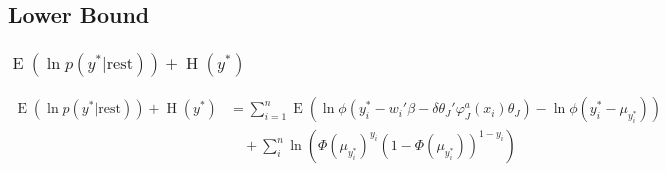 \documentclass[11pt]{article}
\newcommand{\opn}{\operatorname}
\begin{document}
\subsection{Lower Bound}
\subsubsection{$\opn{E}\left(\ln p\left(y^{*}|\text{rest}\right)\right)+\opn{H}\left(y^{*}\right)$}
  \begin{align*}
    \opn{E}\left(\ln p\left(y^{*}|\text{rest}\right)\right) + \opn{H}\left(y^{*}\right) &= \sum_{i=1}^{n}\opn{E}\left(\ln \phi\left(y_{i}^{*}-w_{i}'\beta-\delta \theta_{J}'\varphi_{J}^{a}\left(x_{i}\right)\theta_{J}\right) - \ln \phi\left(y_{i}^{*}-\mu_{y_{i}^{*}}\right)\right)\\
    &\quad + \sum_{i}^{n}\ln \left(\Phi\left(\mu_{y_{i}^{*}}\right)^{y_{i}}\left(1-\Phi\left(\mu_{y_{i}^{*}}\right)\right)^{1-y_{i}} \right)
  \end{align*}
 
\end{document}
